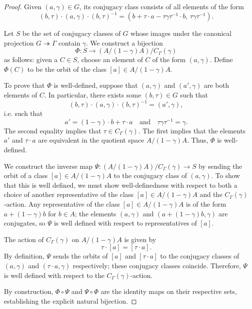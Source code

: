 \begin{proof}
    Given $(a,\gamma) \in G$, its conjugacy class consists of all elements of the form
    $$(b, \tau) \cdot (a, \gamma) \cdot (b,\tau)^{-1} = (b + \tau \cdot a - \tau \gamma \tau^{-1} \cdot b, \, \tau \gamma \tau^{-1}).$$

    Let $S$ be the set of conjugacy classes of $G$ whose images under the canonical projection $G \twoheadrightarrow \Gamma$ contain $\gamma$. We construct a bijection
    $$\Phi: S \longrightarrow (A/(1-\gamma) A) / C_\Gamma(\gamma)$$
    as follows: given a $C \in S$, choose an element of $C$ of the form $(a,\gamma)$. Define $\Phi(C)$ to be the orbit of the class $[a] \in A / (1 - \gamma) A$. 

    To prove that $\Phi$ is well-defined, suppose that $(a, \gamma)$ and $(a', \gamma)$ are both elements of $C$. In particular, there exists some $(b, \tau) \in G$ such that
    $$(b, \tau) \cdot (a, \gamma) \cdot (b, \tau)^{-1} = (a', \gamma),$$
    i.e. such that 
    $$a' = (1 - \gamma)\cdot b + \tau \cdot a \quad \text{and} \quad \tau \gamma \tau^{-1} = \gamma  .$$
    The second equality implies that $\tau \in C_\Gamma(\gamma)$. The first implies that the elements $a'$ and $\tau \cdot a$ are equivalent in the quotient space $A / (1-\gamma)A$. Thus, $\Phi$ is well-defined.
    
    We construct the inverse map $\Psi: (A/(1-\gamma)A) / C_\Gamma(\gamma) \to S$ by sending the orbit of a class $[a] \in A / (1-\gamma)A$ to the conjugacy class of $(a, \gamma)$. To show that this is well defined, we must show well-definedness with respect to both a choice of another representative of the class $[a] \in A/(1-\gamma)A$ and the $C_\Gamma(\gamma)$-action. Any representative of the class $[a] \in A/(1-\gamma)A$ is of the form $a + (1-\gamma) b$ for $b \in A$; the elements $(a,\gamma)$ and $(a + (1-\gamma) b,\gamma)$ are conjugates, so $\Psi$ is well defined with respect to representatives of $[a]$. 
    
    The action of $C_\Gamma(\gamma)$ on $A/(1-\gamma)A$ is given by 
    $$\tau \cdot [a] = [\tau \cdot a].$$
    By definition, $\Psi$ sends the orbits of $[a]$ and $[\tau \cdot a]$ to the conjugacy classes of $(a, \gamma)$ and $( \tau \cdot a, \gamma)$ respectively; these conjugacy classes coincide. Therefore, $\Psi$ is well defined with respect to the $C_\Gamma(\gamma)$-action.

    By construction, $\Phi \circ \Psi$ and $\Psi \circ \Phi$ are the identity maps on their respective sets, establishing the explicit natural bijection.
\end{proof}
